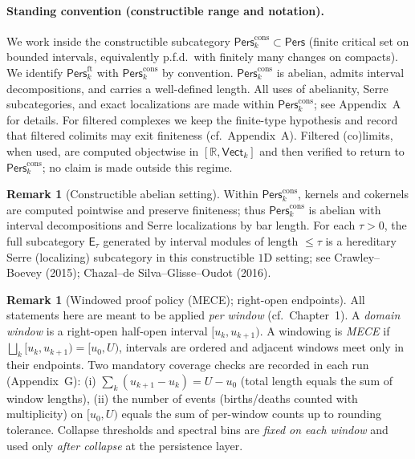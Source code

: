 \documentclass[11pt]{article}
\numberwithin{equation}{section}
\theoremstyle{plain}
\theoremstyle{definition}
\theoremstyle{remark}
\newcommand{\Pers}{\mathsf{Pers}}
\theoremstyle{plain}
\theoremstyle{definition}
\numberwithin{equation}{section}
\theoremstyle{definition}
\newtheorem{remark}[theorem]{Remark}
\numberwithin{equation}{section}
\theoremstyle{plain}
\theoremstyle{definition}
\theoremstyle{remark}
\newcommand{\bbR}{\mathbb{R}}
\newcommand{\Vectk}{\mathsf{Vect}_k}
\newcommand{\Perscons}{\Pers^{\mathrm{cons}}_k}
\newcommand{\Persft}{\Pers^{\mathrm{ft}}_k}
\newcommand{\Ecat}{\mathsf{E}_\tau}
\begin{document}
\paragraph{Standing convention (constructible range and notation).}
We work inside the constructible subcategory
\(\Perscons\subset\Pers\) (finite critical set on bounded intervals, equivalently p.f.d.\ with finitely many changes on compacts).
We identify \(\Persft\) with \(\Perscons\) by convention.
\(\Perscons\) is abelian, admits interval decompositions, and carries a well-defined length. All uses of abelianity, Serre subcategories, and exact localizations are made within \(\Perscons\); see Appendix~A for details.
For filtered complexes we keep the finite-type hypothesis and record that filtered colimits may exit finiteness (cf.\ Appendix~A). Filtered (co)limits, when used, are computed objectwise in \([\bbR,\Vectk]\) and then verified to return to \(\Perscons\); no claim is made outside this regime.

\begin{remark}[Constructible abelian setting]\label{rem:constructible-abelian}
Within \(\Perscons\), kernels and cokernels are computed pointwise and preserve finiteness; thus \(\Perscons\) is abelian with interval decompositions and Serre localizations by bar length. For each \(\tau>0\), the full subcategory \(\Ecat\) generated by interval modules of length \(\le \tau\) is a hereditary Serre (localizing) subcategory in this constructible \(1\)D setting; see Crawley--Boevey (2015); Chazal--de Silva--Glisse--Oudot (2016).
\end{remark}

\begin{remark}[Windowed proof policy (MECE); right-open endpoints]\label{rem:ch2-mece}
All statements here are meant to be applied \emph{per window} (cf.\ Chapter~1). A \emph{domain window} is a right-open half-open interval \([u_k,u_{k+1})\). A windowing is \emph{MECE} if \(\bigsqcup_k [u_k,u_{k+1})=[u_0,U)\), intervals are ordered and adjacent windows meet only in their endpoints. Two mandatory coverage checks are recorded in each run (Appendix~G): (i) \(\sum_k (u_{k+1}-u_k)=U-u_0\) (total length equals the sum of window lengths), (ii) the number of events (births/deaths counted with multiplicity) on \([u_0,U)\) equals the sum of per-window counts up to rounding tolerance. Collapse thresholds and spectral bins are \emph{fixed on each window} and used only \emph{after collapse} at the persistence layer.
\end{remark}
\end{document}
